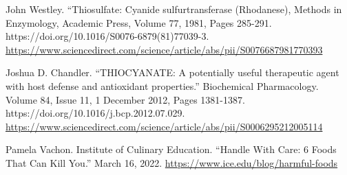 \documentclass[9.5pt]{article}
\begin{document}
\begin{multicols}{2}
\begin{thebibliography}{9}
{	 John Westley. ``Thiosulfate: Cyanide sulfurtransferase (Rhodanese), Methods in Enzymology, Academic Press, Volume 77, 1981, Pages 285-291. https://doi.org/10.1016/S0076-6879(81)77039-3. \url{https://www.sciencedirect.com/science/article/abs/pii/S0076687981770393}
	
	 Joshua D. Chandler. ``THIOCYANATE: A potentially useful therapeutic agent with host defense and antioxidant properties.'' Biochemical Pharmacology. Volume 84, Issue 11, 1 December 2012, Pages 1381-1387. https://doi.org/10.1016/j.bcp.2012.07.029. \url{https://www.sciencedirect.com/science/article/abs/pii/S0006295212005114}
	
	 Pamela Vachon. Institute of Culinary Education. ``Handle With Care: 6 Foods That Can Kill You.'' March 16, 2022. \url{https://www.ice.edu/blog/harmful-foods}
	}
\end{thebibliography}

\end{multicols}

\end{document}
